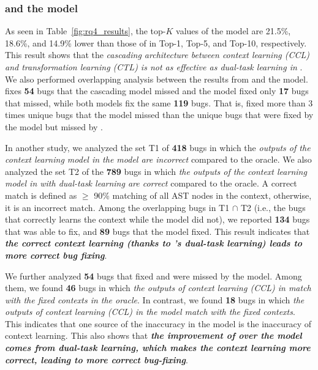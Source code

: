 
\subsubsection{{\bf {\tool} and the  model}}

As seen in Table~\ref{fig:rq4_results}, the top-$K$ values of the
 model are 21.5\%, 18.6\%, and 14.9\% lower than those
of {\tool} in Top-1, Top-5, and Top-10, respectively. This result
shows that the {\em cascading architecture between context learning
  (CCL) and transformation learning (CTL) is not as effective as
  dual-task learning in {\tool}}.
%
We also performed overlapping analysis between the results from
{\tool} and the  model. {\tool} fixes {\bf 54} bugs
that the cascading model missed and the  model fixed
only {\bf 17} bugs that {\tool} missed, while both models fix the same
{\bf 119} bugs. That is, {\tool} fixed more than 3 times unique bugs
that the  model missed than the unique bugs that were
fixed by the  model but missed by {\tool}.




In another study, we analyzed the set T1 of {\bf 418} bugs in which
the {\em outputs of the context learning model in the 
  model are incorrect} compared to the oracle. We also analyzed the
set T2 of the {\bf 789} bugs in which {\em the outputs of the context
  learning model in {\tool} with dual-task learning are correct}
compared to the oracle. A correct match is defined as $\geq$ 90\%
matching of all AST nodes in the context, otherwise, it is an
incorrect match. Among the overlapping bugs in T1 $\cap$ T2 (i.e., the
bugs that {\tool} correctly learns the context while the
 model did not), we reported {\bf 134} bugs that
     {\tool} was able to fix, and {\bf 89} bugs that the
      model fixed.  This result indicates that {\bf {\em
       the correct context learning (thanks to {\tool}'s dual-task
       learning) leads to more correct bug fixing}}.

We further analyzed {\bf 54} bugs that {\tool} fixed and were missed
by the  model. Among them, we found {\bf 46} bugs in
which {\em the outputs of context learning (CCL) in {\tool} match with the fixed contexts
  in the oracle}. In contrast, we found {\bf 18} bugs in which {\em
  the outputs of context learning (CCL) in the  model match with the
  fixed contexts}. This indicates that one source of the inaccuracy in
the  model is the inaccuracy of context learning. This
also shows that {\bf {\em the improvement of {\tool} over the
   model comes from dual-task learning, which makes
  the context learning more correct, leading to more correct
  bug-fixing}}.

